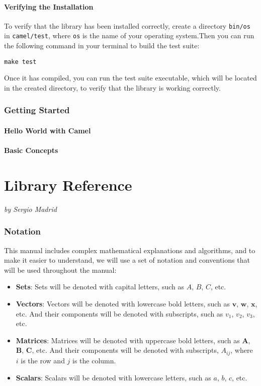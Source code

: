 \documentclass[a4paper,oneside,8pt]{extarticle}
\newcommand{\authoredpart}[2]{
  \clearpage
  \part{#1}
  \vspace{-1em} %
  \Large{\textit{by #2}}
  \vspace{2em} %
}
\theoremstyle{definition}
\begin{document}
\subsection{Verifying the Installation}

To verify that the library has been installed correctly, create a directory \texttt{bin/os} in \texttt{camel/test}, where \texttt{os} is the name of your operating system.Then you can run the following command in your terminal to build the test suite:

\begin{verbatim}
make test
\end{verbatim}

Once it has compiled, you can run the test suite executable, which will be located in the created directory, to verify that the library is working correctly.

\section{Getting Started}
\subsection{Hello World with Camel}
\subsection{Basic Concepts}


\authoredpart{Library Reference}{Sergio Madrid} \label{part:library_reference}

\section{Notation}

This manual includes complex mathematical explanations and algorithms, and to make it easier to understand, we will use a set of notation and conventions that will be used throughout the manual:
\begin{itemize}
  \item \textbf{Sets}: Sets will be denoted with capital letters, such as $A$, $B$, $C$, etc.
  \item \textbf{Vectors}: Vectors will be denoted with lowercase bold letters, such as $\mathbf{v}$, $\mathbf{w}$, $\mathbf{x}$, etc. And their components will be denoted with subscripts, such as $v_1$, $v_2$, $v_3$, etc.
  \item \textbf{Matrices}: Matrices will be denoted with uppercase bold letters, such as $\mathbf{A}$, $\mathbf{B}$, $\mathbf{C}$, etc. And their components will be denoted with subscripts, $A_{ij}$, where $i$ is the row and $j$ is the column.
  \item \textbf{Scalars}: Scalars will be denoted with lowercase letters, such as $a$, $b$, $c$, etc.
\end{itemize}
\end{document}
